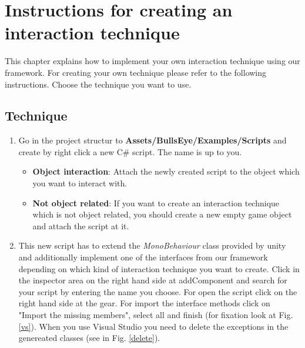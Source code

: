 \documentclass[../../Instructions_Framework]{subfiles}
\begin{document}
\chapter{Instructions for creating an interaction technique}
\label{technique}

This chapter explains how to implement your own interaction technique using our framework. For creating your own technique please refer to the following instructions. Choose the technique you want to use.

\section{Technique}
\begin{enumerate}
	\item Go in the project structur to \textbf{Assets/BullsEye/Examples/Scripts} and create by right click a new C\# script. The name is up to you.
	\begin{itemize}
		\item \textbf{Object interaction}: Attach the newly created script to the object which you want to interact with.
		\item \textbf{Not object related}: If you want to create an interaction technique which is not object related, you should create a new empty game object and attach the script at it.
	\end{itemize}
	\item This new script has to extend the \textit{MonoBehaviour} class provided by unity and additionally implement one of the interfaces from our framework depending on which kind of interaction technique you want to create. Click in the inspector area on the right hand side at addComponent and search for your script by entering the name you choose. For open the script click on the right hand side at the gear. For import the interface methods click on "Import the missing members", select all and finish (for fixation look at Fig. \ref{vs}). When you use Visual Studio you need to delete the exceptions in the genereated classes (see in Fig. \ref{delete}).
	\newpage
	

\end{enumerate}
\end{document}

